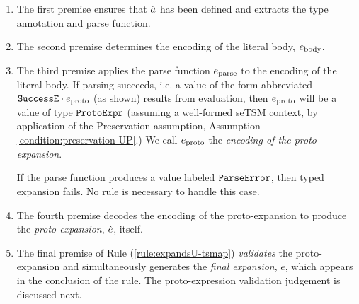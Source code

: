 \begin{enumerate}
\item The first premise ensures that $\hat{a}$ has been defined and extracts the type annotation and parse function.
\item The second premise determines the encoding of the literal body, $e_\text{body}$.
\item The third premise applies the parse function $e_\text{parse}$ to the encoding of the literal body. If parsing succeeds, i.e. a value of the form abbreviated $\mathtt{SuccessE}\cdot e_\text{proto}$ (as shown) results from evaluation, then $e_\text{proto}$ will be a value of type $\mathtt{ProtoExpr}$ (assuming a well-formed seTSM context, by application of the Preservation assumption, Assumption \ref{condition:preservation-UP}.) We call $e_\text{proto}$ the \emph{encoding of the proto-expansion}.

If the parse function produces a value labeled $\mathtt{ParseError}$, then typed expansion fails. No rule is necessary to handle this case. 

\item The fourth premise decodes the encoding of the proto-expansion to produce the \emph{proto-expansion}, $\grave{e}$, itself.

\item The final premise of Rule (\ref{rule:expandsU-tsmap}) \emph{validates} the proto-expansion and simultaneously generates the \emph{final expansion}, $e$, which appears in the conclusion of the rule. The proto-expression validation judgement is discussed next.
\end{enumerate}
